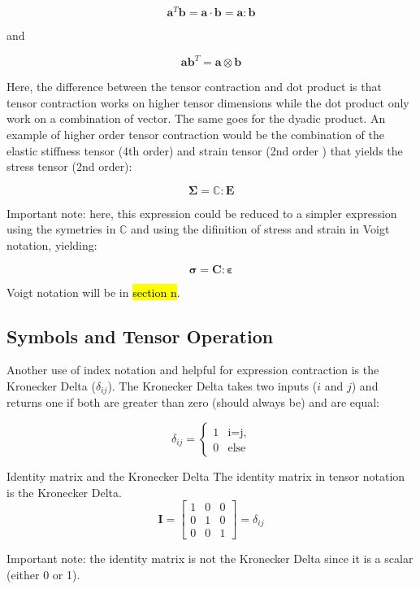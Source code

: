 $$\mathbf{a}^T\mathbf{b} = \mathbf{a} \cdot \mathbf{b} = \mathbf{a} : \mathbf{b}$$

and 

$$\mathbf{a}\mathbf{b}^T = \mathbf{a}\otimes \mathbf{b}$$

Here, the difference between the tensor contraction and dot product is that tensor contraction works on higher tensor dimensions while the dot product only work on a combination of vector. The same goes for the dyadic product. An example of higher order tensor contraction would be the combination of the elastic stiffness tensor (4th order) and strain tensor (2nd order ) that yields the stress tensor (2nd order):

$$ \boldsymbol{\Sigma} = \mathbb{C}:\boldsymbol{E} $$

Important note: here, this expression could be reduced to a simpler expression using the symetries in $\mathbb{C}$ and using the difinition of stress and strain in Voigt notation, yielding:

$$ \boldsymbol{\sigma} = \boldsymbol{C} :\boldsymbol{\varepsilon} $$

Voigt notation will be in \hl{section n}.

\subsection{Symbols and Tensor Operation}
\label{sec:tensoroperation}
Another use of index notation and helpful for expression contraction is the Kronecker Delta ($\delta_{ij}$). The Kronecker Delta takes two inputs ($i$ and $j$) and returns one if both are greater than zero (should always be) and are equal:

$$
\delta_{ij}=
\begin{cases}
    1 & \text{i=j},\\
    0 & \text{else}
\end{cases}
$$

\begin{example}{Identity matrix and the Kronecker Delta}
The identity matrix in tensor notation is the Kronecker Delta.
    $$ 
        \boldsymbol{I} = 
        \begin{bmatrix}
        1 & 0 & 0 \\
        0 & 1 & 0 \\
        0 & 0 & 1    
        \end{bmatrix}
        =
        \delta_{ij}
    $$

    Important note: the identity matrix is not the Kronecker Delta since it is a scalar (either 0 or 1).

\end{example}

